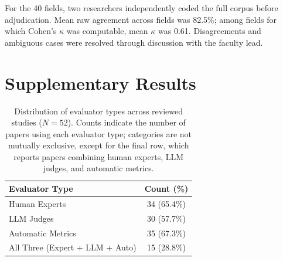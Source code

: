 For the 40 fields, two researchers independently coded
the full corpus before adjudication. Mean raw agreement across fields was
82.5\%; among fields for which Cohen's $\kappa$ was computable, mean
$\kappa$ was 0.61. Disagreements and ambiguous cases were resolved through
discussion with the faculty lead.

\section{Supplementary Results}
\label{app:supp-results}

\begin{table}[tbp]
\centering
\small
\begin{tabular}{lc}
\toprule
\textbf{Evaluator Type} & \textbf{Count (\%)} \\
\midrule
Human Experts & 34 (65.4\%) \\
LLM Judges & 30 (57.7\%) \\
Automatic Metrics & 35 (67.3\%) \\
All Three (Expert + LLM + Auto) & 15 (28.8\%) \\
\bottomrule
\end{tabular}
\caption{Distribution of evaluator types across reviewed studies ($N=52$). Counts indicate the number of papers using each evaluator type; categories are not mutually exclusive, except for the final row, which reports papers combining human experts, LLM judges, and automatic metrics.}\label{tab:evaluator-types}
\end{table}

